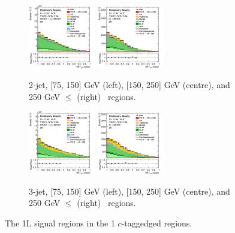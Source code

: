 \begin{figure}[h!]
    \centering
    \begin{subfigure}[b]{\textwidth}
        \centering
        \includegraphics[width=0.32\textwidth]{Images/VH/Own_fit/postfit_VHcc/Region_distmva_BMax250_BMin150_DSR_J2_TTypent_T1_L1_Y6051_GlobalFit_conditionnal_mu1.png}
        \includegraphics[width=0.32\textwidth]{Images/VH/Own_fit/postfit_VHcc/Region_distmva_BMin250_DSR_J2_TTypent_T1_L1_Y6051_GlobalFit_conditionnal_mu1.png}
        \caption{2-jet, [75, 150] GeV (left), [150, 250] GeV (centre), and 250  GeV $\leq$ (right) \ptv\ regions.}
        \label{fig:plots_VHcc_1L_SR_2J_1c}
    \end{subfigure}
    \begin{subfigure}[b]{\textwidth}
        \centering
        \includegraphics[width=0.32\textwidth]{Images/VH/Own_fit/postfit_VHcc/Region_distmva_BMax250_BMin150_DSR_J3_TTypent_T1_L1_Y6051_GlobalFit_conditionnal_mu1.png}
        \includegraphics[width=0.32\textwidth]{Images/VH/Own_fit/postfit_VHcc/Region_distmva_BMin250_DSR_J3_TTypent_T1_L1_Y6051_GlobalFit_conditionnal_mu1.png}
        \caption{3-jet, [75, 150] GeV (left), [150, 250] GeV (centre), and 250  GeV $\leq$ (right) \ptv\ regions.}
        \label{fig:plots_VHcc_1L_SR_3J_1c}
    \end{subfigure}
    \caption{The 1L signal regions in the 1 $c$-taggedged regions.}
    \label{fig:plots_VHcc_1L_SR_1c}
\end{figure}

